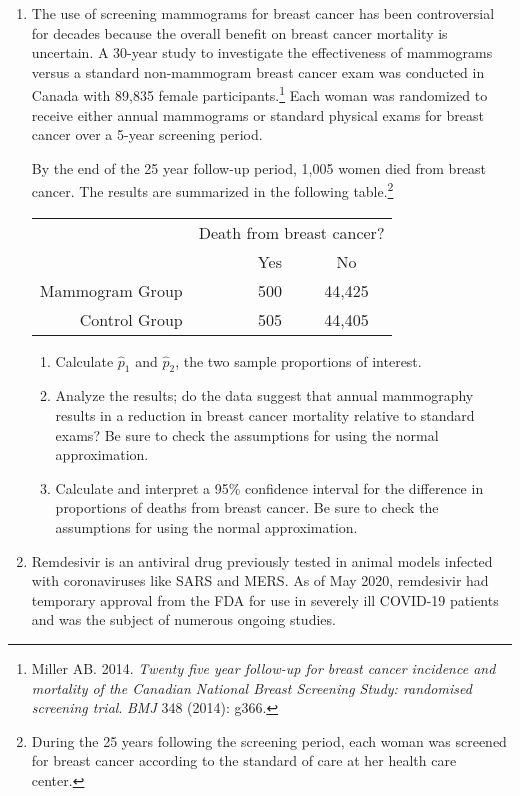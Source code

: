 \documentclass[letterpaper,12pt,twoside,]{pinp}
\begin{document}
\begin{enumerate}
\def\labelenumi{\arabic{enumi}.}
\item
  The use of screening mammograms for breast cancer has been
  controversial for decades because the overall benefit on breast cancer
  mortality is uncertain. A 30-year study to investigate the
  effectiveness of mammograms versus a standard non-mammogram breast
  cancer exam was conducted in Canada with 89,835 female
  participants.\footnote{Miller AB. 2014. \emph{Twenty five year follow-up for breast cancer incidence and mortality of the Canadian National Breast Screening Study: randomised screening trial}. \textit{BMJ} 348 (2014): g366. }
  Each woman was randomized to receive either annual mammograms or
  standard physical exams for breast cancer over a 5-year screening
  period.

  By the end of the 25 year follow-up period, 1,005 women died from
  breast cancer. The results are summarized in the following
  table.\footnote{During the 25 years following the screening period, each woman was screened for breast cancer according to the standard of care at her health care center. }

  \begin{table}[h]
   \centering
   \begin{tabular}{rrcc}
       & \multicolumn{3}{c}{Death from breast cancer?} \\
       \cline{2-4}
       & \ \hspace{3mm}\ & Yes & No \\
       \hline
       Mammogram Group && 500 & 44,425 \\
       Control Group && 505 & 44,405 \\
       \hline
   \end{tabular}
  \end{table}

  \begin{enumerate}
  \def\labelenumii{\alph{enumii})}
  \item
    Calculate \(\hat{p}_1\) and \(\hat{p}_2\), the two sample
    proportions of interest.
  \item
    Analyze the results; do the data suggest that annual mammography
    results in a reduction in breast cancer mortality relative to
    standard exams? Be sure to check the assumptions for using the
    normal approximation.
  \item
    Calculate and interpret a 95\% confidence interval for the
    difference in proportions of deaths from breast cancer. Be sure to
    check the assumptions for using the normal approximation.
  \end{enumerate}
\item
  Remdesivir is an antiviral drug previously tested in animal models
  infected with coronaviruses like SARS and MERS. As of May 2020,
  remdesivir had temporary approval from the FDA for use in severely ill
  COVID-19 patients and was the subject of numerous ongoing studies.


\end{enumerate}
\end{document}
